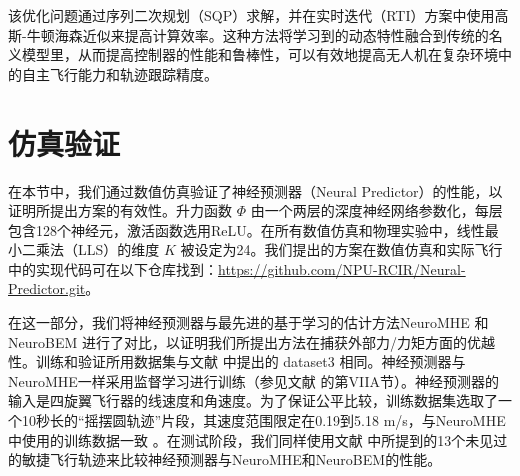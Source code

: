 \documentclass[lang=chs, degree=master, blindreview=false, winfonts=true]{yanputhesis}
\begin{document}
该优化问题通过序列二次规划（SQP）求解，并在实时迭代（RTI）方案中使用高斯-牛顿海森近似来提高计算效率。这种方法将学习到的动态特性融合到传统的名义模型里，从而提高控制器的性能和鲁棒性，可以有效地提高无人机在复杂环境中的自主飞行能力和轨迹跟踪精度。

\section{仿真验证}
在本节中，我们通过数值仿真验证了神经预测器（Neural Predictor）的性能，以证明所提出方案的有效性。升力函数 $\Phi$ 由一个两层的深度神经网络参数化，每层包含128个神经元，激活函数选用ReLU。在所有数值仿真和物理实验中，线性最小二乘法（LLS）的维度 $K$ 被设定为24。我们提出的方案在数值仿真和实际飞行中的实现代码可在以下仓库找到：\href{https://github.com/NPU-RCIR/Neural-Predictor.git}{https://github.com/NPU-RCIR/Neural-Predictor.git}。

在这一部分，我们将神经预测器与最先进的基于学习的估计方法NeuroMHE \cite{Wang2024e} 和 NeuroBEM \cite{Bauersfeld2021} 进行了对比，以证明我们所提出方法在捕获外部力/力矩方面的优越性。训练和验证所用数据集与文献 \cite{Bauersfeld2021} 中提出的 dataset3 相同。神经预测器与NeuroMHE一样采用监督学习进行训练（参见文献 \cite{Wang2024e} 的第VIIA节）。神经预测器的输入是四旋翼飞行器的线速度和角速度。为了保证公平比较，训练数据集选取了一个10秒长的“摇摆圆轨迹”片段，其速度范围限定在0.19到5.18 m/s，与NeuroMHE中使用的训练数据一致 \cite{Wang2024e}。在测试阶段，我们同样使用文献 \cite{Wang2024e} 中所提到的13个未见过的敏捷飞行轨迹来比较神经预测器与NeuroMHE和NeuroBEM的性能。
\end{document}
